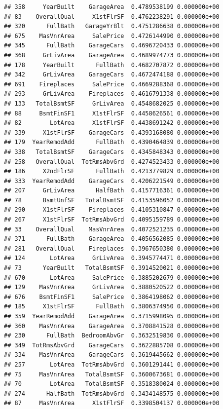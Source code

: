 \documentclass[american,]{article}
\theoremstyle{definition}
\theoremstyle{definition}
\theoremstyle{definition}
\theoremstyle{remark}
\begin{document}
\begin{verbatim}
## 358     YearBuilt    GarageArea  0.4789538199 0.000000e+00
## 83    OverallQual     X1stFlrSF  0.4762238291 0.000000e+00
## 320      FullBath   GarageYrBlt  0.4751286638 0.000000e+00
## 675    MasVnrArea     SalePrice  0.4726144990 0.000000e+00
## 345      FullBath    GarageCars  0.4696720433 0.000000e+00
## 368     GrLivArea    GarageArea  0.4689974773 0.000000e+00
## 178     YearBuilt      FullBath  0.4682707872 0.000000e+00
## 342     GrLivArea    GarageCars  0.4672474188 0.000000e+00
## 691    Fireplaces     SalePrice  0.4669288368 0.000000e+00
## 293     GrLivArea    Fireplaces  0.4616791338 0.000000e+00
## 133   TotalBsmtSF     GrLivArea  0.4548682025 0.000000e+00
## 88     BsmtFinSF1     X1stFlrSF  0.4458626561 0.000000e+00
## 82        LotArea     X1stFlrSF  0.4438691242 0.000000e+00
## 339     X1stFlrSF    GarageCars  0.4393168080 0.000000e+00
## 179  YearRemodAdd      FullBath  0.4390464839 0.000000e+00
## 338   TotalBsmtSF    GarageCars  0.4345848343 0.000000e+00
## 258   OverallQual  TotRmsAbvGrd  0.4274523433 0.000000e+00
## 186     X2ndFlrSF      FullBath  0.4213779829 0.000000e+00
## 333  YearRemodAdd    GarageCars  0.4206221549 0.000000e+00
## 207     GrLivArea      HalfBath  0.4157716361 0.000000e+00
## 78      BsmtUnfSF   TotalBsmtSF  0.4153596052 0.000000e+00
## 290     X1stFlrSF    Fireplaces  0.4105310847 0.000000e+00
## 267     X1stFlrSF  TotRmsAbvGrd  0.4095159789 0.000000e+00
## 33    OverallQual    MasVnrArea  0.4072521235 0.000000e+00
## 371      FullBath    GarageArea  0.4056562085 0.000000e+00
## 281   OverallQual    Fireplaces  0.3967650380 0.000000e+00
## 124       LotArea     GrLivArea  0.3945774471 0.000000e+00
## 73      YearBuilt   TotalBsmtSF  0.3914520021 0.000000e+00
## 670       LotArea     SalePrice  0.3885202679 0.000000e+00
## 129    MasVnrArea     GrLivArea  0.3880520522 0.000000e+00
## 676    BsmtFinSF1     SalePrice  0.3864198062 0.000000e+00
## 185     X1stFlrSF      FullBath  0.3806374950 0.000000e+00
## 359  YearRemodAdd    GarageArea  0.3715998095 0.000000e+00
## 360    MasVnrArea    GarageArea  0.3708841528 0.000000e+00
## 230      FullBath  BedroomAbvGr  0.3632519830 0.000000e+00
## 349  TotRmsAbvGrd    GarageCars  0.3622885708 0.000000e+00
## 334    MasVnrArea    GarageCars  0.3619445662 0.000000e+00
## 257       LotArea  TotRmsAbvGrd  0.3601291441 0.000000e+00
## 75     MasVnrArea   TotalBsmtSF  0.3600673681 0.000000e+00
## 70        LotArea   TotalBsmtSF  0.3518380024 0.000000e+00
## 274      HalfBath  TotRmsAbvGrd  0.3434148575 0.000000e+00
## 87     MasVnrArea     X1stFlrSF  0.3398504137 0.000000e+00

\end{verbatim}
\end{document}
